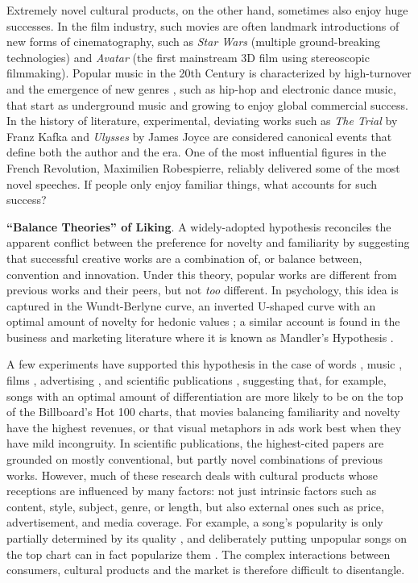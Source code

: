 \documentclass[letterpaper]{article} %
\begin{document}
Extremely novel cultural products, on the other hand, sometimes also enjoy huge successes. In the film industry, such movies are often landmark introductions of new forms of cinematography, such as \emph{Star Wars} (multiple ground-breaking technologies) and \emph{Avatar} (the first mainstream 3D film using stereoscopic filmmaking). Popular music in the 20th Century is characterized by high-turnover and the emergence of new genres \cite{mauch2015evolution}, such as hip-hop and electronic dance music, that start as underground music and growing to enjoy global commercial success. In the history of literature, experimental, deviating works such as \emph{The Trial} by Franz Kafka and \emph{Ulysses} by James Joyce are considered canonical events that define both the author and the era. One of the most influential figures in the French Revolution, Maximilien Robespierre, reliably delivered some of the most novel speeches. If people only enjoy familiar things, what accounts for such success?

\textbf{``Balance Theories'' of Liking}. A widely-adopted hypothesis reconciles the apparent conflict between the preference for novelty and familiarity by suggesting that successful creative works are a combination of, or balance between, convention and innovation. Under this theory, popular works are different from previous works and their peers, but not \emph{too} different. In psychology, this idea is captured in the Wundt-Berlyne curve, an inverted U-shaped curve with an optimal amount of novelty for hedonic values \cite{berlyne1970novelty}; a similar account is found in the business and marketing literature where it is known as Mandler's Hypothesis \cite{meyers1989schema}. 

A few experiments have supported this hypothesis in the case of words \cite{sluckin1980liking}, music \cite{hargreaves1984effects,askin2017makes},  films \cite{sreenivasan2013quantitative}, advertising \cite{mohanty2016visual}, and scientific publications \cite{uzzi2013atypical}, suggesting that, for example, songs with an optimal amount of differentiation are more likely to be on the top of the Billboard's Hot 100 charts, that movies balancing familiarity and novelty have the highest revenues, or that visual metaphors in ads work best when they have mild incongruity. In scientific publications, the highest-cited papers are grounded on mostly conventional, but partly novel combinations of previous works. However, much of these research deals with cultural products whose receptions are influenced by many factors: not just intrinsic factors such as content, style, subject, genre, or length, but also external ones such as price, advertisement, and media coverage. For example, a song's popularity is only partially determined by its quality \cite{salganik2006experimental}, and deliberately putting unpopular songs on the top chart can in fact popularize them \cite{salganik2008leading}. The complex interactions between consumers, cultural products and the market is therefore difficult to disentangle. 
\end{document}
